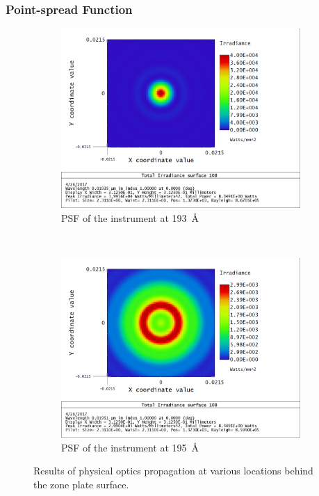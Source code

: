 \documentclass[10pt,letterpaper]{article}
\begin{document}
			\subsubsection{Point-spread Function}
			
				\begin{figure}[h!]
					\centering
					\begin{subfigure}[t]{0.49\textwidth}
						\includegraphics[width=\textwidth]{pop/pop108_zoom2}
						\caption{PSF of the instrument at \SI{193}{\angstrom}}
						\label{psf193}
					\end{subfigure}
					~
					\begin{subfigure}[t]{0.49\textwidth}
						\includegraphics[width=\textwidth]{pop/pop108_zoom2_195}	
						\caption{PSF of the instrument at \SI{195}{\angstrom}}
						\label{psf195}
					\end{subfigure}
					\caption{Results of physical optics propagation at various locations behind the zone plate surface.}
					\label{psf}
				\end{figure}
			
\end{document}
